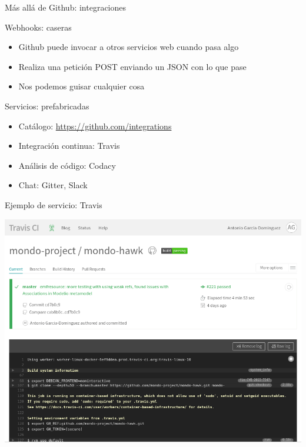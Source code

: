 \documentclass[xcolor=svgnames]{beamer}
\begin{document}
\begin{frame}{Más allá de Github: integraciones}
  \begin{block}{Webhooks: caseras}
    \begin{itemize}
    \item Github puede invocar a otros servicios web cuando pasa algo
    \item Realiza una petición POST enviando un JSON con lo que pase
    \item Nos podemos guisar cualquier cosa
    \end{itemize}
  \end{block}

  \begin{block}{Servicios: prefabricadas}
    \begin{itemize}
    \item Catálogo: \url{https://github.com/integrations}
    \item Integración continua: Travis
    \item Análisis de código: Codacy
    \item Chat: Gitter, Slack
    \end{itemize}
  \end{block}
\end{frame}

\begin{frame}{Ejemplo de servicio: Travis}
  \begin{center}
    \includegraphics[width=.9\textwidth,height=.8\textheight,keepaspectratio]{travis}
  \end{center}
\end{frame}
\end{document}

